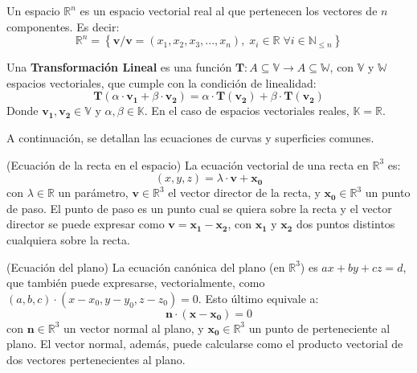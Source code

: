 \begin{definition}
    Un espacio $\mathbb{R}^n$ es un espacio vectorial real al que pertenecen
    los vectores de $n$ componentes. Es decir:
    \begin{equation*}
        \mathbb{R}^n = \left\{ \boldsymbol{v} / \boldsymbol{v}=(x_1,x_2,x_3,...,x_n), \; x_i \in \mathbb{R} \;\forall i \in \mathbb{N}_{\leq n} \right\}
    \end{equation*}
\end{definition}
\begin{definition}
    Una \textbf{Transformación Lineal} es una función $\boldsymbol{T}:A\subseteq \mathbb{V} \rightarrow A\subseteq \mathbb{W}$, con 
    $\mathbb{V}$ y $\mathbb{W}$ espacios vectoriales, que cumple con la condición de linealidad:
    \begin{equation*}
        \boldsymbol{T}(\alpha \cdot \boldsymbol{v_1} + \beta \cdot \boldsymbol{v_2})=\alpha \cdot \boldsymbol{T}(\boldsymbol{v_2}) + \beta \cdot \boldsymbol{T}(\boldsymbol{v_2})
    \end{equation*}
    Donde $\boldsymbol{v_1},\boldsymbol{v_2} \in \mathbb{V}$ y $\alpha,\beta \in \mathbb{K}$. En el caso de espacios vectoriales reales,
    $\mathbb{K} = \mathbb{R}$.
\end{definition}
A continuación, se detallan las ecuaciones de curvas y superficies comunes.
\begin{definition}
    (Ecuación de la recta en el espacio) La ecuación vectorial de una recta en $\mathbb{R}^3$ es:
    \begin{equation*}
        (x,y,z) = \lambda \cdot \boldsymbol{v} + \boldsymbol{x_0}
    \end{equation*}
    con $\lambda\in\mathbb{R}$ un parámetro, $\boldsymbol{v}\in\mathbb{R}^3$ el vector director de la recta,
    y $\boldsymbol{x_0}\in\mathbb{R}^3$ un punto de paso. El punto de paso es un punto cual se quiera
    sobre la recta y el vector director se puede expresar como $\boldsymbol{v}=\boldsymbol{x_1}-\boldsymbol{x_2}$, 
    con $\boldsymbol{x_1}$ y $\boldsymbol{x_2}$ dos puntos distintos cualquiera sobre la recta.
\end{definition}
\begin{definition}
    (Ecuación del plano) La ecuación canónica del plano (en $\mathbb{R}^3$) es $ax+by+cz=d$, que también puede expresarse,
    vectorialmente, como $(a,b,c)\cdot(x-x_0,y-y_0,z-z_0)=0$. Esto último equivale a:
    \begin{equation*}
        \boldsymbol{n}\cdot(\boldsymbol{x} - \boldsymbol{x_0})=0
    \end{equation*}
    con $\boldsymbol{n}\in\mathbb{R}^3$ un vector normal al plano, y $\boldsymbol{x_0}\in\mathbb{R}^3$
    un punto de perteneciente al plano. El vector normal, además, puede calcularse como el producto vectorial
    de dos vectores pertenecientes al plano.
\end{definition}
